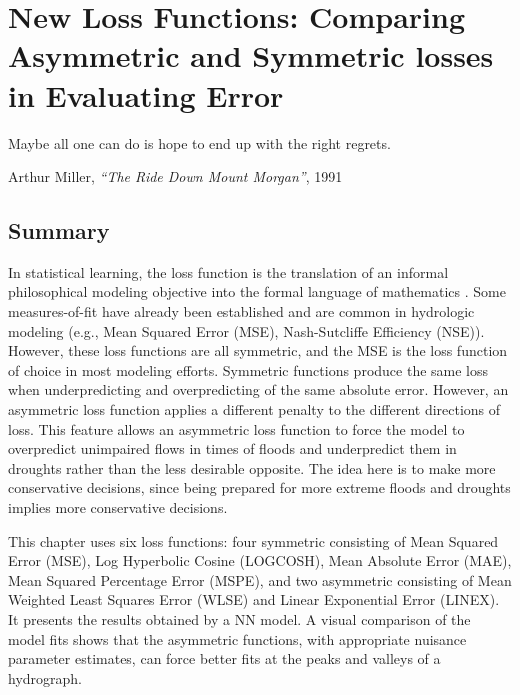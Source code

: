 \chapter[New Loss Functions]{New Loss Functions: Comparing Asymmetric and Symmetric losses in Evaluating Error} \label{ch3:loss}
\setlength{\epigraphwidth}{4.5in}
\epigraph{Maybe all one can do is hope to end up with the right regrets.}{Arthur Miller, \textit{``The Ride Down Mount Morgan''}, 1991}

\section*{Summary}
In statistical learning, the loss function is the translation of an informal philosophical modeling objective into the formal language of mathematics \cite{hennig2007some}. Some measures-of-fit have already been established and are common in hydrologic modeling (e.g., Mean Squared Error (MSE), Nash-Sutcliffe Efficiency (NSE)). However, these loss functions are all symmetric, and the MSE is the loss function of choice in most modeling efforts. Symmetric functions produce the same loss when underpredicting and overpredicting of the same absolute error. However, an asymmetric loss function applies a different penalty to the different directions of loss. This feature allows an asymmetric loss function to force the model to overpredict unimpaired flows in times of floods and underpredict them in droughts rather than the less desirable opposite. The idea here is to make more conservative decisions, since being prepared for more extreme floods and droughts implies more conservative decisions. 

This chapter uses six loss functions: four symmetric consisting of Mean Squared Error (MSE), Log Hyperbolic Cosine (LOGCOSH), Mean Absolute Error (MAE), Mean Squared Percentage Error (MSPE), and two asymmetric consisting of Mean Weighted Least Squares Error (WLSE) and Linear Exponential Error (LINEX). It presents the results obtained by a NN model. A visual comparison of the model fits shows that the asymmetric functions, with appropriate nuisance parameter estimates, can force better fits at the peaks and valleys of a hydrograph.  

